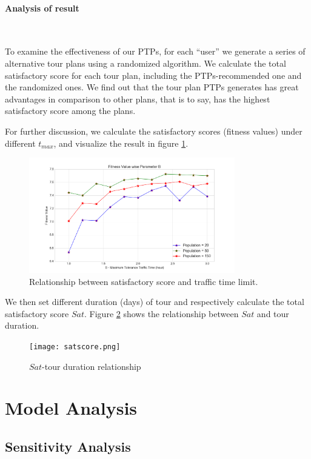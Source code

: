 \documentclass{mcmthesis}
\begin{document}
  \paragraph{Analysis of result} \
  
  To examine the effectiveness of our PTPs, for each ``user'' we generate a series of alternative tour plans using a randomized algorithm. We calculate the total satisfactory score for each tour plan, including the PTPs-recommended one and the randomized ones. We find out that the tour plan PTPs generates has great advantages in comparison to other plans, that is to say, has the highest satisfactory score among the plans. \par
  For further discussion, we calculate the satisfactory scores (fitness values) under different $t_{max}$, and visualize the result in figure \ref{fig:sstt}. \par
  \begin{figure}[ht]
    \centering
    \includegraphics[width=0.8\textwidth]{popularity.png}
    \caption{Relationship between satisfactory score and traffic time limit.}
    \label{fig:sstt}
  \end{figure}
  We then set different duration (days) of tour and respectively calculate the total satisfactory score $Sat$. Figure \ref{fig:satscore} shows the relationship between $Sat$ and tour duration. \par
  \begin{figure}[H]
    \centering
    \texttt{[image: satscore.png]}
    \caption{$Sat$-tour duration relationship}
    \label{fig:satscore}
  \end{figure}



\section{Model Analysis}
\subsection{Sensitivity Analysis}
\end{document}
